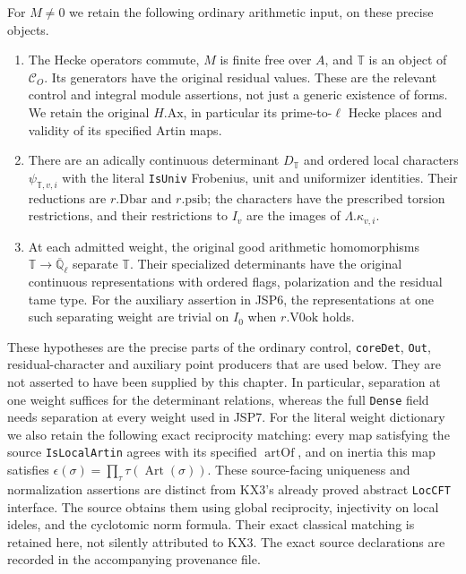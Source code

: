 For $M\ne0$ we retain the following ordinary arithmetic input,
on these precise objects.
\begin{enumerate}
\item The Hecke operators commute, $M$ is finite free over $A$,
and $\mathbb T$ is an object of $\mathcal C_O$. Its generators have
the original residual values. These are the relevant control and
integral module assertions, not just a generic existence of forms.
We retain the original $H.\mathrm{Ax}$, in particular its
prime-to-$\ell$ Hecke places and validity of its specified Artin maps.
\item There are an adically continuous determinant $D_{\mathbb T}$
and ordered local characters $\psi_{\mathbb T,v,i}$ with the
literal \texttt{IsUniv} Frobenius, unit and uniformizer identities.
Their reductions are $r.\mathrm{Dbar}$ and $r.\mathrm{psib}$;
the characters have the prescribed torsion restrictions, and
their restrictions to $I_v$ are the images of $\Lambda.\kappa_{v,i}$.
\item At each admitted weight, the original good arithmetic
homomorphisms $\mathbb T\to\overline{\mathbb Q}_\ell$ separate
$\mathbb T$. Their specialized determinants have the original
continuous representations with ordered flags, polarization and
the residual tame type. For the auxiliary assertion in JSP6,
the representations at one such separating weight are trivial
on $I_0$ when $r.\mathrm{V0ok}$ holds.
\end{enumerate}
These hypotheses are the precise parts of the ordinary control,
\texttt{coreDet}, \texttt{Out}, residual-character and auxiliary
point producers that are used below. They are not asserted to have
been supplied by this chapter. In particular, separation at one
weight suffices for the determinant relations, whereas the full
\texttt{Dense} field needs separation at every weight used in JSP7.
For the literal weight dictionary we also retain the following exact
reciprocity matching: every map satisfying the source
\texttt{IsLocalArtin} agrees with its specified $\operatorname{artOf}$,
and on inertia this map satisfies
$\epsilon(\sigma)=\prod_\tau\tau(\operatorname{Art}(\sigma))$.
These source-facing uniqueness and normalization assertions are
distinct from KX3's already proved abstract \texttt{LocCFT} interface.
The source obtains them using global reciprocity, injectivity on
local ideles, and the cyclotomic norm formula. Their exact classical
matching is retained here, not silently attributed to KX3.
The exact source declarations are recorded in the accompanying
provenance file.

